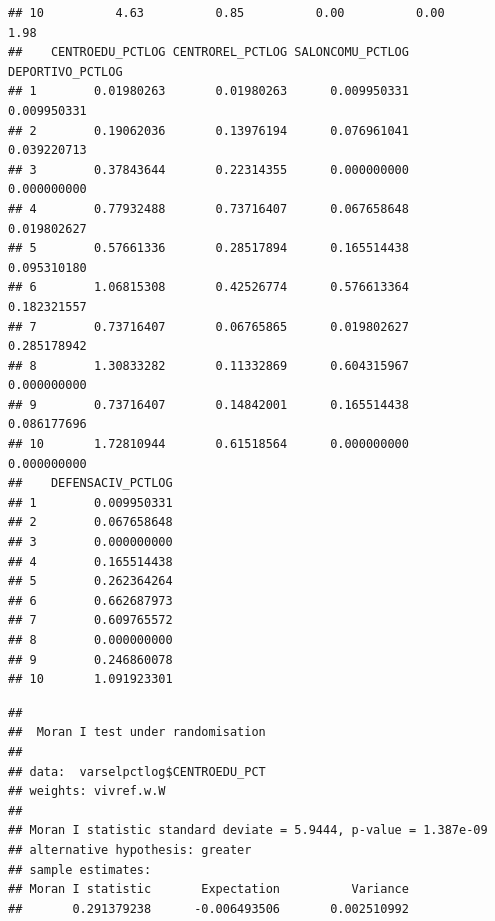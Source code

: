\documentclass[11pt,]{article}
\newenvironment{Shaded}{\begin{snugshade}}{\end{snugshade}}
\newcommand{\KeywordTok}[1]{\textcolor[rgb]{0.13,0.29,0.53}{\textbf{#1}}}
\newcommand{\DataTypeTok}[1]{\textcolor[rgb]{0.13,0.29,0.53}{#1}}
\newcommand{\StringTok}[1]{\textcolor[rgb]{0.31,0.60,0.02}{#1}}
\newcommand{\OperatorTok}[1]{\textcolor[rgb]{0.81,0.36,0.00}{\textbf{#1}}}
\newcommand{\NormalTok}[1]{#1}
\begin{document}
\begin{verbatim}
## 10          4.63          0.85          0.00          0.00           1.98
##    CENTROEDU_PCTLOG CENTROREL_PCTLOG SALONCOMU_PCTLOG DEPORTIVO_PCTLOG
## 1        0.01980263       0.01980263      0.009950331      0.009950331
## 2        0.19062036       0.13976194      0.076961041      0.039220713
## 3        0.37843644       0.22314355      0.000000000      0.000000000
## 4        0.77932488       0.73716407      0.067658648      0.019802627
## 5        0.57661336       0.28517894      0.165514438      0.095310180
## 6        1.06815308       0.42526774      0.576613364      0.182321557
## 7        0.73716407       0.06765865      0.019802627      0.285178942
## 8        1.30833282       0.11332869      0.604315967      0.000000000
## 9        0.73716407       0.14842001      0.165514438      0.086177696
## 10       1.72810944       0.61518564      0.000000000      0.000000000
##    DEFENSACIV_PCTLOG
## 1        0.009950331
## 2        0.067658648
## 3        0.000000000
## 4        0.165514438
## 5        0.262364264
## 6        0.662687973
## 7        0.609765572
## 8        0.000000000
## 9        0.246860078
## 10       1.091923301
\end{verbatim}

\begin{Shaded}
\end{Shaded}

\begin{verbatim}
## 
##  Moran I test under randomisation
## 
## data:  varselpctlog$CENTROEDU_PCT  
## weights: vivref.w.W    
## 
## Moran I statistic standard deviate = 5.9444, p-value = 1.387e-09
## alternative hypothesis: greater
## sample estimates:
## Moran I statistic       Expectation          Variance 
##       0.291379238      -0.006493506       0.002510992
\end{verbatim}

\begin{Shaded}
\end{Shaded}
\end{document}
